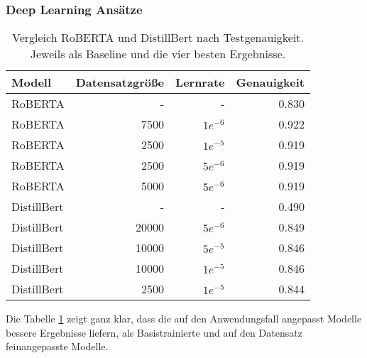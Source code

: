 \subsubsection{Deep Learning Ansätze}
\begin{table}
    \begin{tabular}{lrrr}
        \toprule
        Modell      & Datensatzgröße & Lernrate  & Genauigkeit \\
        \midrule
        RoBERTA     & -              & -         & 0.830       \\
        RoBERTA     & 7500           & $1e^{-6}$ & 0.922       \\
        RoBERTA     & 2500           & $1e^{-5}$ & 0.919       \\
        RoBERTA     & 2500           & $5e^{-6}$ & 0.919       \\
        RoBERTA     & 5000           & $5e^{-6}$ & 0.919       \\
        DistillBert & -              & -         & 0.490       \\
        DistillBert & 20000          & $5e^{-6}$ & 0.849       \\
        DistillBert & 10000          & $5e^{-5}$ & 0.846       \\
        DistillBert & 10000          & $1e^{-5}$ & 0.846       \\
        DistillBert & 2500           & $1e^{-5}$ & 0.844       \\
        \bottomrule
    \end{tabular}
    \caption{
        Vergleich RoBERTA und DistillBert nach Testgenauigkeit. Jeweils als Baseline und die vier besten Ergebnisse.
    }
    \label{tab:top-models-dl}
\end{table}
Die Tabelle \ref{tab:top-models-dl} zeigt ganz klar, dass die auf den Anwendungsfall angepasst Modelle bessere Ergebnisse liefern, als Basistrainierte und auf den Datensatz feinangepasste Modelle.
